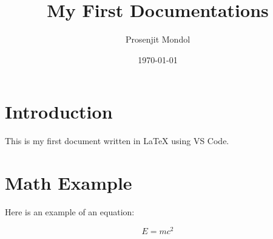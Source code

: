 \documentclass{article}
\title{My First Documentations}
\author{Prosenjit Mondol}
\date{\today}
\begin{document}
\maketitle

\section{Introduction}

This is my first document written in \LaTeX{} using VS Code.

\section{Math Example}

Here is an example of an equation:

\[
E = mc^2
\]
\end{document}
